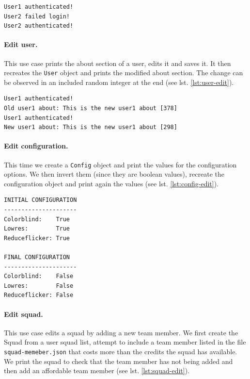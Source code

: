\documentclass{article}
\begin{document}
\begin{lstlisting}[caption={User login use case output.},label={lst:user-login},captionpos=b,frame=single]
User1 authenticated!
User2 failed login!
User2 authenticated!
\end{lstlisting}

\paragraph{Edit user.} This use case prints the about section of a user, edits it and saves it. It then recreates the \texttt{User} object and prints the modified about section. The change can be observed in an included random integer at the end (see lst. \ref{lst:user-edit}).

\begin{lstlisting}[caption={User edit use case output.},label={lst:user-edit},captionpos=b,frame=single]
User1 authenticated!
Old user1 about: This is the new user1 about [378]
User1 authenticated!
New user1 about: This is the new user1 about [298]
\end{lstlisting}

\paragraph{Edit configuration.} This time we create a \texttt{Config} object and print the values for the configuration options. We then invert them (since they are boolean values), recreate the configuration object and print again the values (see lst. \ref{lst:config-edit}).

\begin{lstlisting}[caption={User configuration use case output.},label={lst:config-edit},captionpos=b,frame=single]
INITIAL CONFIGURATION
---------------------
Colorblind:    True
Lowres:        True
Reduceflicker: True

FINAL CONFIGURATION
---------------------
Colorblind:    False
Lowres:        False
Reduceflicker: False
\end{lstlisting}

\paragraph{Edit squad.} This use case edits a squad by adding a new team member. We first create the Squad from a user squad list, attempt to include a team member listed in the file \texttt{squad-memeber.json} that costs more than the credits the squad has available. We print the squad to check that the team member has not being added and then add an affordable team member (see lst. \ref{lst:squad-edit}).
\end{document}
